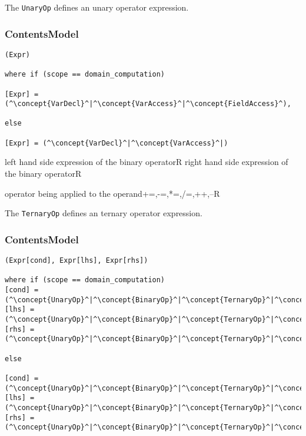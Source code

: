 
The {\tt UnaryOp} defines an unary operator expression.

\subsubsection*{ContentsModel}{}

\begin{lstlisting}[style=default]
(Expr)

where if (scope == domain_computation)

[Expr] = (^\concept{VarDecl}^|^\concept{VarAccess}^|^\concept{FieldAccess}^),

else

[Expr] = (^\concept{VarDecl}^|^\concept{VarAccess}^|)
\end{lstlisting}


\begin{HIRChildElements}
	\HIRElementDef{[lhs]}
	{left hand side expression of the binary operator}{R}
	\HIRElementDef{[rhs]}
	{right hand side expression of the binary operator}{R}
\end{HIRChildElements}

\begin{HIRAttributesVal}
	{operator being applied to the operand}{+=,-=,*=,/=,++,--}{R}
\end{HIRAttributesVal}


The {\tt TernaryOp} defines an ternary operator expression.

\subsubsection*{ContentsModel}{}

\begin{lstlisting}[style=default]
(Expr[cond], Expr[lhs], Expr[rhs])

where if (scope == domain_computation)
[cond] = (^\concept{UnaryOp}^|^\concept{BinaryOp}^|^\concept{TernaryOp}^|^\concept{FieldAccess}^|^\concept{VarAccess}^|^\concept{Literal}^)
[lhs] = (^\concept{UnaryOp}^|^\concept{BinaryOp}^|^\concept{TernaryOp}^|^\concept{FieldAccess}^|^\concept{VarAccess}^|^\concept{Literal}^),
[rhs] =	(^\concept{UnaryOp}^|^\concept{BinaryOp}^|^\concept{TernaryOp}^|^\concept{FieldAccess}^|^\concept{VarAccess}^|^\concept{Literal}^)

else

[cond] = (^\concept{UnaryOp}^|^\concept{BinaryOp}^|^\concept{TernaryOp}^|^\concept{VarAccess}^|^\concept{Literal}^)
[lhs] = (^\concept{UnaryOp}^|^\concept{BinaryOp}^|^\concept{TernaryOp}^|^\concept{VarAccess}^|^\concept{Literal}^)
[rhs] = (^\concept{UnaryOp}^|^\concept{BinaryOp}^|^\concept{TernaryOp}^|^\concept{VarAccess}^|^\concept{Literal}^)
\end{lstlisting}

